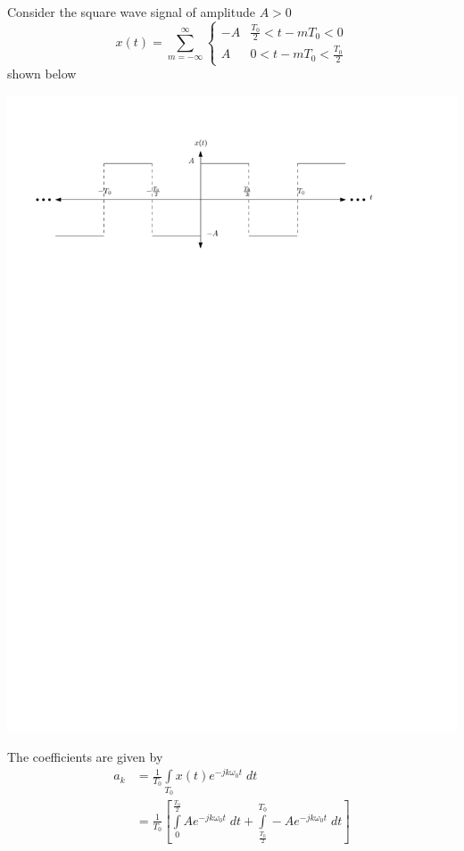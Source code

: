 \begin{example}
  Consider the square wave signal of amplitude $A > 0$
  \[
  x(t) = \sum\limits_{m= -\infty}^{\infty} \left\{ \begin{array}{lc}
    -A & \tfrac{T_0}{2} < t-mT_0 < 0\\[0.5em]
    A & 0 < t - mT_0 < \tfrac{T_0}{2}
  \end{array}
  \right.
  \]
  shown below
  \begin{center}
  \includegraphics[scale=1]{graphics/squarewave.pdf}
  \end{center}
  The coefficients are given by
  \begin{align*}
    a_k &= \frac{1}{T_0} \int\limits_{T_0} x(t)e^{-jk\omega_0 t} \; dt\\
    &= \frac{1}{T_0} \left[ \int\limits_{0}^{\frac{T_0}{2}} Ae^{-jk\omega_0 t} \; dt + \int\limits_{\frac{T_0}{2}}^{T_0} -Ae^{-jk\omega_0 t} \; dt\right]\\

\end{align*}
\end{example}
